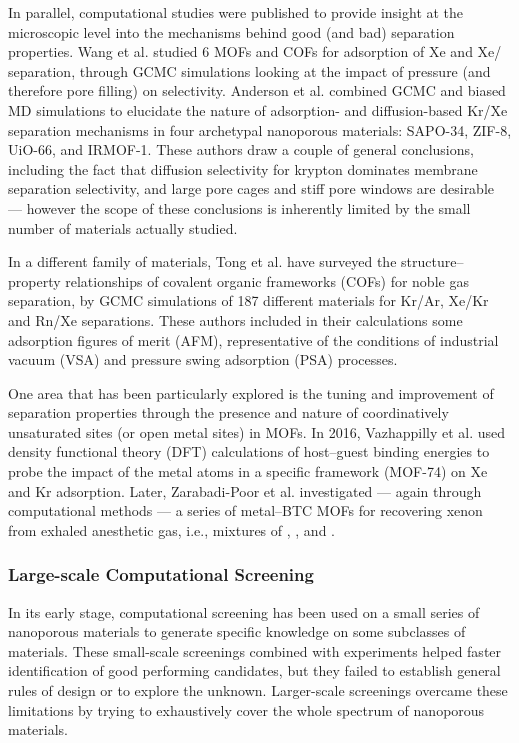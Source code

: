 \documentclass[main.tex]{subfiles}
\begin{document}
In parallel, computational studies were published to provide insight at the microscopic level into the mechanisms behind good (and bad) separation properties. Wang et al.\cite{Wang_2014} studied 6 MOFs and COFs for adsorption of Xe and Xe/ separation, through GCMC simulations looking at the impact of pressure (and therefore pore filling) on selectivity. Anderson et al.\cite{Anderson_2017} combined GCMC and biased MD simulations to elucidate the nature of adsorption- and diffusion-based Kr/Xe separation mechanisms in four archetypal nanoporous materials: SAPO-34, ZIF-8, UiO-66, and IRMOF-1. These authors draw a couple of general conclusions, including the fact that diffusion selectivity for krypton dominates membrane separation selectivity, and large pore cages and stiff pore windows are desirable --- however the scope of these conclusions is inherently limited by the small number of materials actually studied.

In a different family of materials, Tong et al.\cite{Tong_2017} have surveyed the structure--property relationships of covalent organic frameworks (COFs) for noble gas separation, by GCMC simulations of 187 different materials for Kr/Ar, Xe/Kr and Rn/Xe separations. These authors included in their calculations some adsorption figures of merit (AFM), representative of the conditions of industrial vacuum (VSA) and pressure swing adsorption (PSA) processes.

One area that has been particularly explored is the tuning and improvement of separation properties through the presence and nature of coordinatively unsaturated sites (or open metal sites) in MOFs. In 2016, Vazhappilly et al.\cite{Vazhappilly_2016} used density functional theory (DFT) calculations of host--guest binding energies to probe the impact of the metal atoms in a specific framework (MOF-74) on Xe and Kr adsorption. Later, Zarabadi-Poor et al.\cite{ZarabadiPoor_2018} investigated --- again through computational methods --- a series of metal--BTC MOFs for recovering xenon from exhaled anesthetic gas, i.e., mixtures of , , and .

\subsubsection{Large-scale Computational Screening}

In its early stage, computational screening has been used on a small series of nanoporous materials to generate specific knowledge on some subclasses of materials. These small-scale screenings combined with experiments helped faster identification of good performing candidates, but they failed to establish general rules of design or to explore the unknown. Larger-scale screenings overcame these limitations by trying to exhaustively cover the whole spectrum of nanoporous materials.
\end{document}
